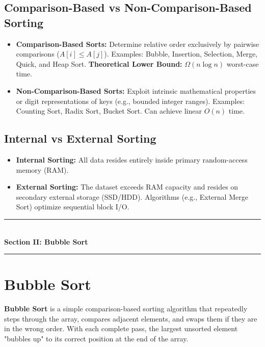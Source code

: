 \subsection{Comparison-Based vs Non-Comparison-Based Sorting}

\begin{itemize}
    \item \textbf{Comparison-Based Sorts:} Determine relative order exclusively by pairwise comparisons ($A[i] \leq A[j]$). Examples: Bubble, Insertion, Selection, Merge, Quick, and Heap Sort. \textbf{Theoretical Lower Bound:} $\Omega(n \log n)$ worst-case time.
    \item \textbf{Non-Comparison-Based Sorts:} Exploit intrinsic mathematical properties or digit representations of keys (e.g., bounded integer ranges). Examples: Counting Sort, Radix Sort, Bucket Sort. Can achieve linear $O(n)$ time.
\end{itemize}

\subsection{Internal vs External Sorting}

\begin{itemize}
    \item \textbf{Internal Sorting:} All data resides entirely inside primary random-access memory (RAM).
    \item \textbf{External Sorting:} The dataset exceeds RAM capacity and resides on secondary external storage (SSD/HDD). Algorithms (e.g., External Merge Sort) optimize sequential block I/O.
\end{itemize}

\newpage
\begin{center}
\vspace{0.5em}
{\color{primary}\rule{0.45\textwidth}{1.2pt}}\\[4pt]
{\Large\bfseries\color{primary} Section II: Bubble Sort}\\[2pt]
{\color{primary}\rule{0.45\textwidth}{1.2pt}}
\vspace{0.5em}
\end{center}

\section{Bubble Sort}

\textbf{Bubble Sort} is a simple comparison-based sorting algorithm that repeatedly steps through the array, compares adjacent elements, and swaps them if they are in the wrong order. With each complete pass, the largest unsorted element "bubbles up" to its correct position at the end of the array.

